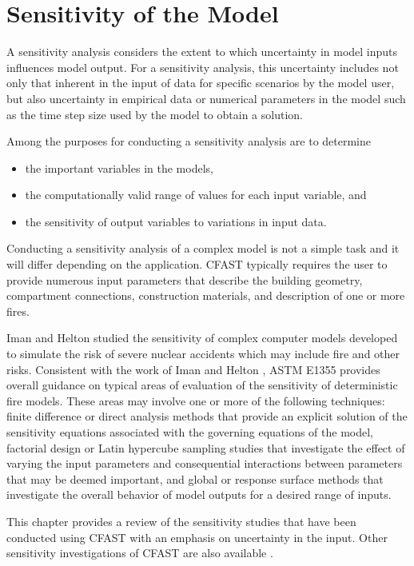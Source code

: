 \chapter{Sensitivity of the Model}

A sensitivity analysis considers the extent to which uncertainty in model inputs influences model 
output.  For a sensitivity analysis, this uncertainty includes not only that inherent in the input of 
data for specific scenarios by the model user, but also uncertainty in empirical data or numerical 
parameters in the model such as the time step size used by the model to obtain a solution. 

Among the purposes for conducting a sensitivity analysis are to determine 
\begin{itemize}
\item the important variables in the models, 
\item the computationally valid range of values for each input variable, and 
\item the sensitivity of output variables to variations in input data. 
\end{itemize}

Conducting a sensitivity analysis of a complex model is not a simple task and it will differ 
depending on the application. CFAST typically requires the user to provide numerous input 
parameters that describe the building geometry, compartment connections, construction 
materials, and description of one or more fires. 

Iman and Helton \cite{Iman:1988} studied the sensitivity of complex computer models developed to simulate the risk of severe nuclear accidents which may include fire and other risks. Consistent with the 
work of Iman and Helton \cite{Iman:1988}, ASTM E1355 \cite{ASTM:E1355} provides overall guidance on typical areas of evaluation of the sensitivity of deterministic fire models.  These areas may involve one or more of the following techniques: finite difference or direct analysis methods that provide an explicit solution of the sensitivity equations associated with the governing equations of the model, 
factorial design or Latin hypercube sampling studies that investigate the effect of varying the 
input parameters and consequential interactions between parameters that may be deemed 
important, and global or response surface methods that investigate the overall behavior of model 
outputs for a desired range of inputs. 

This chapter provides a review of the sensitivity studies that have been conducted using CFAST 
with an emphasis on uncertainty in the input. Other sensitivity investigations of CFAST are also 
available \cite{Peacock:1988a, Beard:1992, Notarianni:2000}. 

